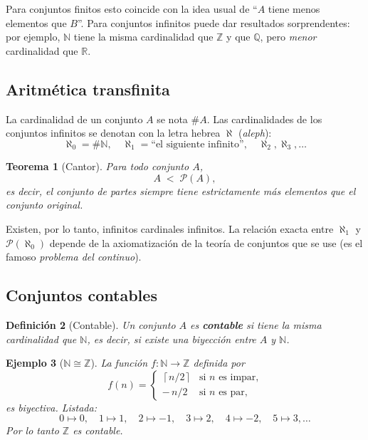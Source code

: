\documentclass[11pt,a4paper]{article}
\theoremstyle{definicion}
\newtheorem{definicion}{Definición}[section]
\newtheorem{teorema}[definicion]{Teorema}
\newtheorem{ejemplo}[definicion]{Ejemplo}
\newcommand{\N}{\mathbb{N}}
\newcommand{\Z}{\mathbb{Z}}
\newcommand{\Q}{\mathbb{Q}}
\newcommand{\R}{\mathbb{R}}
\begin{document}
\begin{intuicion}
Para conjuntos finitos esto coincide con la idea usual de ``$A$ tiene menos elementos que $B$''. Para conjuntos infinitos puede dar resultados sorprendentes: por ejemplo, $\N$ tiene la misma cardinalidad que $\Z$ y que $\Q$, pero \emph{menor} cardinalidad que $\R$.
\end{intuicion}

\subsection{Aritmética transfinita}

La cardinalidad de un conjunto $A$ se nota $\#A$. Las cardinalidades de los conjuntos infinitos se denotan con la letra hebrea $\aleph$ (\emph{aleph}):
\[
\aleph_0 = \#\N, \quad \aleph_1 = \text{``el siguiente infinito''}, \quad \aleph_2, \aleph_3, \dots
\]

\begin{teorema}[Cantor]
Para todo conjunto $A$,
\[
A \;<\; \mathcal{P}(A),
\]
es decir, el conjunto de partes siempre tiene \emph{estrictamente} más elementos que el conjunto original.
\end{teorema}

Existen, por lo tanto, infinitos cardinales infinitos. La relación exacta entre $\aleph_1$ y $\mathcal{P}(\aleph_0)$ depende de la axiomatización de la teoría de conjuntos que se use (es el famoso \emph{problema del continuo}).

\subsection{Conjuntos contables}

\begin{definicion}[Contable]
Un conjunto $A$ es \textbf{contable} si tiene la misma cardinalidad que $\N$, es decir, si existe una biyección entre $A$ y $\N$.
\end{definicion}

\begin{ejemplo}[$\N \cong \Z$]
La función $f : \N \to \Z$ definida por
\[
f(n) = \begin{cases} \left\lceil n / 2 \right\rceil & \text{si } n \text{ es impar,} \\ -\,n / 2 & \text{si } n \text{ es par,} \end{cases}
\]
es biyectiva. Listada:
\[
0 \mapsto 0, \quad 1 \mapsto 1, \quad 2 \mapsto -1, \quad 3 \mapsto 2, \quad 4 \mapsto -2, \quad 5 \mapsto 3, \dots
\]
Por lo tanto $\Z$ es contable.
\end{ejemplo}
\end{document}
